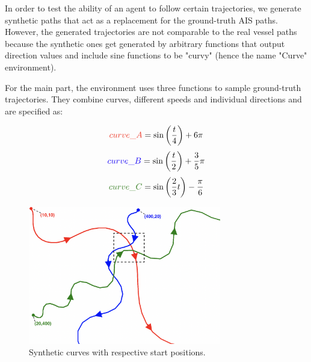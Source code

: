 In order to test the ability of an agent to follow certain trajectories, we generate synthetic paths that act as a replacement for the ground-truth AIS paths. However, the generated trajectories are not comparable to the real vessel paths because the synthetic ones get generated by arbitrary functions that output direction values and include sine functions to be "curvy" (hence the name "Curve" environment).
\par
For the main part, the environment uses three functions to sample ground-truth trajectories. They combine curves, different speeds and individual directions and are specified as:

\begin{equation}\label{eq:curve_A}
\textcolor[RGB]{235,52,35}{curve\_A} = \sin \left( \frac{t}{4} \right) + 6\pi
\end{equation}
\begin{equation}
\textcolor[RGB]{20,1,244}{curve\_B} = \sin \left( \frac{t}{2} \right)+ \frac{3}{5}\pi
\end{equation}
\begin{equation}
\textcolor[RGB]{54,125,34}{curve\_C} = \sin \left( \frac{2}{3} t \right) - \frac{\pi}{6}
\end{equation}

\begin{figure}[H]
    \centering
    \includegraphics[width=0.75\textwidth]{images/curves.png}
    \caption{Synthetic curves with respective start positions.}
    \label{fig:syntheticCurves}
\end{figure}

